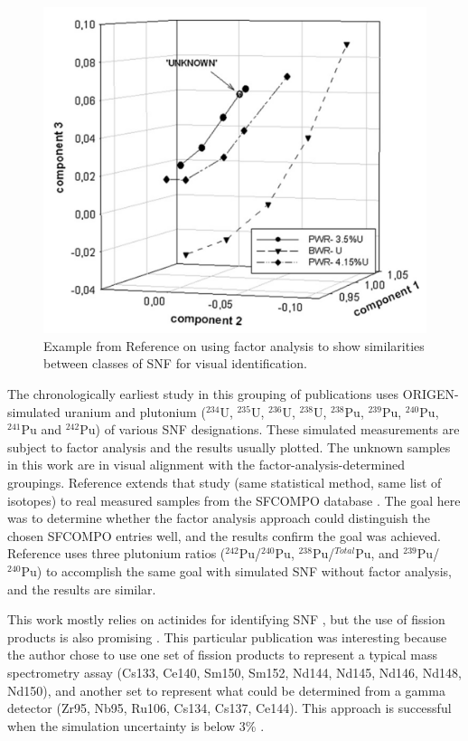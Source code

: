 \begin{figure}[!htb]
  \centering
  \includegraphics[width=0.5\linewidth]{./chapters/litrev/nicolaou.png}
  \caption{Example from Reference \cite{nicolaou_pu} on using factor analysis 
           to show similarities between classes of \gls{SNF} for visual 
           identification.}
  \label{fig:nico}
\end{figure}

The chronologically earliest study in this grouping of publications
\cite{nicolaou_2006} uses \gls{ORIGEN}-simulated uranium and plutonium
(${}^{234}\text{U}$, ${}^{235}\text{U}$, ${}^{236}\text{U}$,
${}^{238}\text{U}$, ${}^{238}\text{Pu}$, ${}^{239}\text{Pu}$,
${}^{240}\text{Pu}$, ${}^{241}\text{Pu}$ and ${}^{242}\text{Pu}$) of various
\gls{SNF} designations.  These simulated measurements are subject to factor
analysis and the results usually plotted.  The unknown samples in this work are
in visual alignment with the factor-analysis-determined groupings.  Reference
\cite{nicolaou_2014} extends that study (same statistical method, same list of
isotopes) to real measured samples from the \gls{SFCOMPO} database
\cite{sfcompo, valid_sfco}.  The goal here was to determine whether the factor
analysis approach could distinguish the chosen \gls{SFCOMPO} entries well, and
the results confirm the goal was achieved.  Reference \cite{nicolaou_2015} uses
three plutonium ratios (${}^{242}\text{Pu}$/${}^{240}\text{Pu}$,
${}^{238}\text{Pu}$/${}^{Total}\text{Pu}$, and
${}^{239}\text{Pu}$/${}^{240}\text{Pu}$) to accomplish the same goal with
simulated \gls{SNF} without factor analysis, and the results are similar. 

This work mostly relies on actinides for identifying \gls{SNF}
\cite{nicolaou_2006, nicolaou_pu, nicolaou_2014, nicolaou_2015}, but the use of
fission products is also promising \cite{nicolaou_2009}.  This particular
publication was interesting because the author chose to use one set of fission
products to represent a typical mass spectrometry assay (Cs133, Ce140, Sm150,
Sm152, Nd144, Nd145, Nd146, Nd148, Nd150), and another set to represent what
could be determined from a gamma detector (Zr95, Nb95, Ru106, Cs134, Cs137,
Ce144).  This approach is successful when the simulation uncertainty is below
3\% \cite{nicolaou_2009}.

